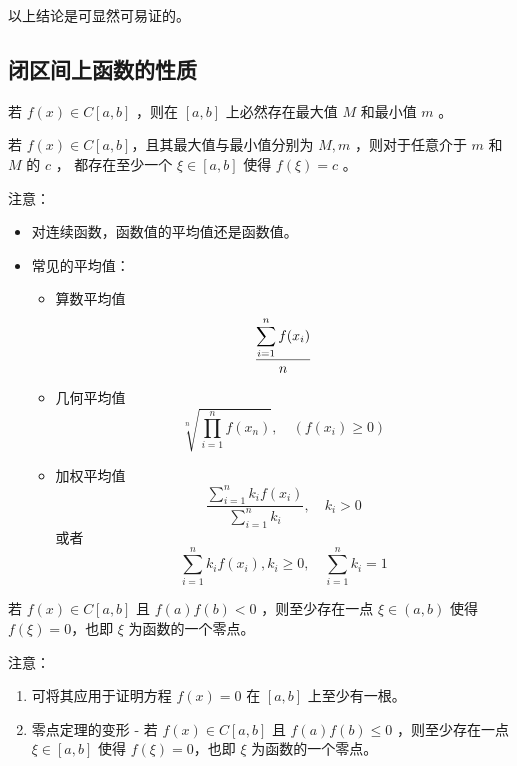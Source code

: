 以上结论是可显然可易证的。

\subsection{闭区间上函数的性质}

\begin{Theo}[最值定理]

    若 $ f(x)\in C[a,b] $ ，则在 $ [a,b] $ 上必然存在最大值 $ M $ 和最小值 $ m $ 。
\end{Theo}

\begin{Theo}[介值定理]

    若 $ f(x)\in C[a,b] $，且其最大值与最小值分别为 $ M,m $ ，则对于任意介于 $ m $ 和 $ M $ 的 $ c $ ，
    都存在至少一个 $ \xi\in[a,b] $ 使得 $ f(\xi)=c $ 。
\end{Theo}

注意：
\begin{itemize}
    \item 对连续函数，函数值的平均值还是函数值。
    \item 常见的平均值：\begin{itemize}
        \item 算数平均值$$
            \frac{\displaystyle \sum_{i=1}^n f(x_i)}{n}
        $$ 
        \item 几何平均值$$
            \sqrt[n]{\prod_{i=1}^n f(x_n)},\quad{} (f(x_i)\geq0)
        $$ 
        \item 加权平均值$$
            \frac{\sum_{i=1}^n k_if(x_i)}{\sum_{i=1}^nk_i},\quad{}k_i>0
        $$ 
        或者$$
            \sum_{i=1}^nk_i f(x_i),k_i\geq0,\quad{}\sum_{i=1}^nk_i=1
        $$ 
    \end{itemize}
\end{itemize}

\begin{Def}[零点定理]

    若 $ f(x)\in C[a,b] $ 且 $ f(a)f(b)<0 $ ，则至少存在一点 $ \xi\in (a,b) $ 使得
    $ f(\xi)=0 $，也即 $ \xi $ 为函数的一个零点。
\end{Def}

注意：
\begin{enumerate}
    \item 可将其应用于证明方程 $ f(x)=0 $ 在 $ [a,b] $ 上至少有一根。
    \item 零点定理的变形 - 若 $ f(x)\in C[a,b] $ 且 $ f(a)f(b)\leq0 $ ，则至少存在一点 $ \xi\in [a,b] $ 使得
    $ f(\xi)=0 $，也即 $ \xi $ 为函数的一个零点。
\end{enumerate}


